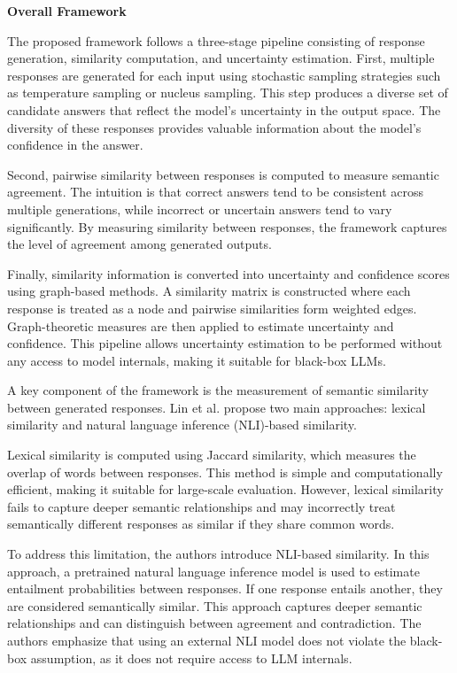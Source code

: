 \textbf{Overall Framework}

The proposed framework follows a three-stage pipeline consisting of response generation, similarity computation, and uncertainty estimation. First, multiple responses are generated for each input using stochastic sampling strategies such as temperature sampling or nucleus sampling. This step produces a diverse set of candidate answers that reflect the model's uncertainty in the output space. The diversity of these responses provides valuable information about the model's confidence in the answer.

Second, pairwise similarity between responses is computed to measure semantic agreement. The intuition is that correct answers tend to be consistent across multiple generations, while incorrect or uncertain answers tend to vary significantly. By measuring similarity between responses, the framework captures the level of agreement among generated outputs.

Finally, similarity information is converted into uncertainty and confidence scores using graph-based methods. A similarity matrix is constructed where each response is treated as a node and pairwise similarities form weighted edges. Graph-theoretic measures are then applied to estimate uncertainty and confidence. This pipeline allows uncertainty estimation to be performed without any access to model internals, making it suitable for black-box LLMs.


A key component of the framework is the measurement of semantic similarity between generated responses. Lin et al. propose two main approaches: lexical similarity and natural language inference (NLI)-based similarity.

Lexical similarity is computed using Jaccard similarity, which measures the overlap of words between responses. This method is simple and computationally efficient, making it suitable for large-scale evaluation. However, lexical similarity fails to capture deeper semantic relationships and may incorrectly treat semantically different responses as similar if they share common words.

To address this limitation, the authors introduce NLI-based similarity. In this approach, a pretrained natural language inference model is used to estimate entailment probabilities between responses. If one response entails another, they are considered semantically similar. This approach captures deeper semantic relationships and can distinguish between agreement and contradiction. The authors emphasize that using an external NLI model does not violate the black-box assumption, as it does not require access to LLM internals.

